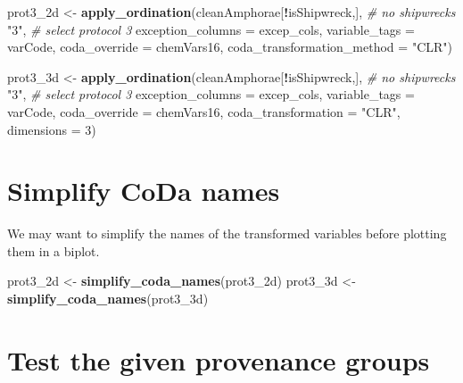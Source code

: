\documentclass[12pt,]{book}
\newenvironment{Shaded}{\begin{snugshade}}{\end{snugshade}}
\newcommand{\CommentTok}[1]{\textcolor[rgb]{0.56,0.35,0.01}{\textit{#1}}}
\newcommand{\DataTypeTok}[1]{\textcolor[rgb]{0.13,0.29,0.53}{#1}}
\newcommand{\DecValTok}[1]{\textcolor[rgb]{0.00,0.00,0.81}{#1}}
\newcommand{\KeywordTok}[1]{\textcolor[rgb]{0.13,0.29,0.53}{\textbf{#1}}}
\newcommand{\NormalTok}[1]{#1}
\newcommand{\OperatorTok}[1]{\textcolor[rgb]{0.81,0.36,0.00}{\textbf{#1}}}
\newcommand{\StringTok}[1]{\textcolor[rgb]{0.31,0.60,0.02}{#1}}
\begin{document}
\begin{Shaded}
\begin{Highlighting}[]
\NormalTok{prot3_2d <-}\StringTok{ }\KeywordTok{apply_ordination}\NormalTok{(cleanAmphorae[}\OperatorTok{!}\NormalTok{isShipwreck,], }\CommentTok{# no shipwrecks}
                             \StringTok{"3"}\NormalTok{, }\CommentTok{# select protocol 3}
                             \DataTypeTok{exception_columns =}\NormalTok{ excep_cols,}
                             \DataTypeTok{variable_tags =}\NormalTok{ varCode,}
                             \DataTypeTok{coda_override =}\NormalTok{ chemVars16,}
                             \DataTypeTok{coda_transformation_method =} \StringTok{"CLR"}\NormalTok{)}

\NormalTok{prot3_3d <-}\StringTok{ }\KeywordTok{apply_ordination}\NormalTok{(cleanAmphorae[}\OperatorTok{!}\NormalTok{isShipwreck,], }\CommentTok{# no shipwrecks}
                             \StringTok{"3"}\NormalTok{, }\CommentTok{# select protocol 3}
                             \DataTypeTok{exception_columns =}\NormalTok{ excep_cols,}
                             \DataTypeTok{variable_tags =}\NormalTok{ varCode,}
                             \DataTypeTok{coda_override =}\NormalTok{ chemVars16,}
                             \DataTypeTok{coda_transformation =} \StringTok{"CLR"}\NormalTok{,}
                             \DataTypeTok{dimensions =} \DecValTok{3}\NormalTok{)}
\end{Highlighting}
\end{Shaded}

\hypertarget{simplify-coda-names-1}{%
\section{Simplify CoDa names}\label{simplify-coda-names-1}}

We may want to simplify the names of the transformed variables before plotting them in a biplot.

\begin{Shaded}
\begin{Highlighting}[]
\NormalTok{prot3_2d <-}\StringTok{ }\KeywordTok{simplify_coda_names}\NormalTok{(prot3_2d)}
\NormalTok{prot3_3d <-}\StringTok{ }\KeywordTok{simplify_coda_names}\NormalTok{(prot3_3d)}
\end{Highlighting}
\end{Shaded}

\hypertarget{test-the-given-provenance-groups}{%
\section{Test the given provenance groups}\label{test-the-given-provenance-groups}}
\end{document}
